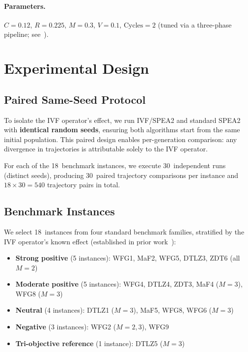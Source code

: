 \documentclass[runningheads]{llncs}
\begin{document}
\paragraph{Parameters.} $C = 0.12$, $R = 0.225$, $M = 0.3$, $V = 0.1$,
$\text{Cycles} = 2$ (tuned via a three-phase pipeline;
see~\cite{sanches2026ivfspea2}).


\section{Experimental Design}
\label{sec:experiments}

\subsection{Paired Same-Seed Protocol}

To isolate the IVF operator's effect, we run IVF/SPEA2 and standard
SPEA2 with \textbf{identical random seeds}, ensuring both algorithms
start from the same initial population. This paired design enables
per-generation comparison: any divergence in trajectories is attributable
solely to the IVF operator.

For each of the 18~benchmark instances, we execute 30~independent runs
(distinct seeds), producing 30~paired trajectory comparisons per instance
and $18 \times 30 = 540$ trajectory pairs in total.

\subsection{Benchmark Instances}

We select 18~instances from four standard benchmark families, stratified
by the IVF operator's known effect (established in prior
work~\cite{sanches2026ivfspea2}):

\begin{itemize}
  \item \textbf{Strong positive} (5 instances): WFG1, MaF2, WFG5, DTLZ3,
    ZDT6 (all $M=2$)
  \item \textbf{Moderate positive} (5 instances): WFG4, DTLZ4, ZDT3,
    MaF4 ($M=3$), WFG8 ($M=3$)
  \item \textbf{Neutral} (4 instances): DTLZ1 ($M=3$), MaF5, WFG8,
    WFG6 ($M=3$)
  \item \textbf{Negative} (3 instances): WFG2 ($M=2,3$), WFG9
  \item \textbf{Tri-objective reference} (1 instance): DTLZ5 ($M=3$)
\end{itemize}
\end{document}
